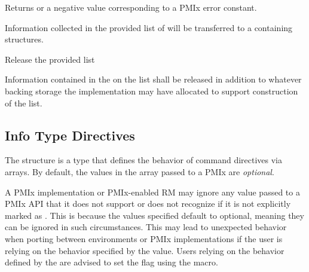 Returns  or a negative value corresponding to a PMIx error constant.

\descr

Information collected in the provided list of  will be transferred to a  containing  structures.



\summary

Release the provided  list

\format



\begin{arglist}
\end{arglist}

\descr

Information contained in the  on the list shall be released in addition to whatever backing storage the implementation may have allocated to support construction of the list.


\subsection{Info Type Directives}
\label{api:struct:infodirs}

The  structure is a  type that defines the behavior of command directives via  arrays.
By default, the values in the  array passed to a PMIx are \emph{optional}.

\adviceuserstart
A PMIx implementation or PMIx-enabled \ac{RM} may ignore any  value passed to a \ac{PMIx} \ac{API} that it does not support or does not recognize if it is not explicitly marked as .
This is because the values specified default to optional, meaning they can be ignored in such circumstances.
This may lead to unexpected behavior when porting between environments or \ac{PMIx} implementations if the user is relying on the behavior specified by the  value.
Users relying on the behavior defined by the  are advised to set the  flag using the  macro.
\adviceuserend

